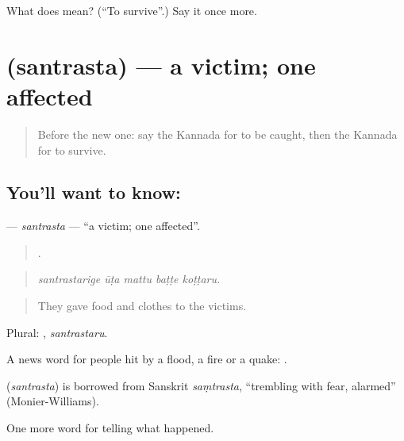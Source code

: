 \begin{tcolorbox}[breakable,colback=teal!4,colframe=teal!35!black,title={Before you move on}]
What does  mean? (\textquotedblleft{}To survive\textquotedblright{}.) Say it once more.
\end{tcolorbox}
\section[\texorpdfstring{\kn{ಸಂತ್ರಸ್ತ} (santrasta)}{ಸಂತ್ರಸ್ತ (santrasta)}]{ (santrasta) — a victim; one affected}

\label{lesson:KA-C332-santrasta}



\begin{quote}
Before the new one: say the Kannada for to be caught, then the Kannada for to survive.
\end{quote}

\subsection*{You'll want to know: }
\textbf{} — \emph{santrasta} — \textquotedblleft{}a victim; one affected\textquotedblright{}.

\begin{quote}
    .
\end{quote}

\begin{quote}
\emph{santrastarige ūṭa mattu baṭṭe koṭṭaru.}
\end{quote}

\begin{quote}
They gave food and clothes to the victims.
\end{quote}

Plural: , \emph{santrastaru}.

A news word for people hit by a flood, a fire or a quake:  .

\begin{cousinweb}
\textbf{} (\emph{santrasta}) is borrowed from Sanskrit \emph{saṃtrasta}, \textquotedblleft{}trembling with fear, alarmed\textquotedblright{} (Monier-Williams).
\end{cousinweb}

\begin{grammarlens}[title={What you've built}]
One more word for telling what happened.
\end{grammarlens}

